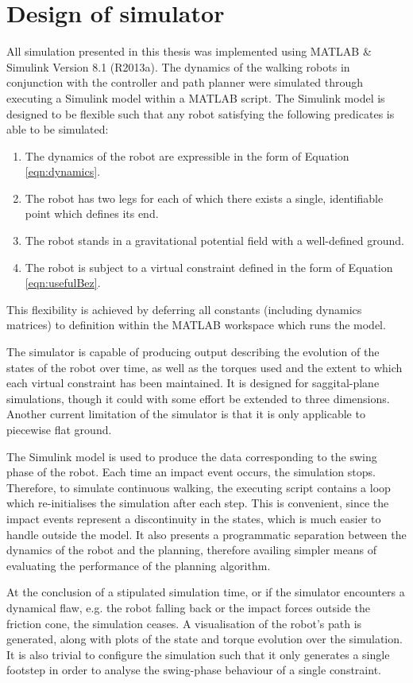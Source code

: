 \section{Design of simulator}
All simulation presented in this thesis was implemented using MATLAB \& Simulink Version 8.1 (R2013a). The dynamics of the walking robots in conjunction with the controller and path planner were simulated through executing a Simulink model within a MATLAB script. The Simulink model is designed to be flexible such that any robot satisfying the following predicates is able to be simulated:
\begin{enumerate}
	\item The dynamics of the robot are expressible in the form of Equation \ref{eqn:dynamics}.
	\item The robot has two legs for each of which there exists a single, identifiable point which defines its end.
	\item The robot stands in a gravitational potential field with a well-defined ground.
	\item The robot is subject to a virtual constraint defined in the form of Equation \ref{eqn:usefulBez}.
\end{enumerate}

This flexibility is achieved by deferring all constants (including dynamics matrices) to definition within the MATLAB workspace which runs the model.

The simulator is capable of producing output describing the evolution of the states of the robot over time, as well as the torques used and the extent to which each virtual constraint has been maintained. It is designed for saggital-plane simulations, though it could with some effort be extended to three dimensions. Another current limitation of the simulator is that it is only applicable to piecewise flat ground.

The Simulink model is used to produce the data corresponding to the swing phase of the robot. Each time an impact event occurs, the simulation stops. Therefore, to simulate continuous walking, the executing script contains a loop which re-initialises the simulation after each step. This is convenient, since the impact events represent a discontinuity in the states, which is much easier to handle outside the model. It also presents a programmatic separation between the dynamics of the robot and the planning, therefore availing simpler means of evaluating the performance of the planning algorithm.

At the conclusion of a stipulated simulation time, or if the simulator encounters a dynamical flaw, e.g. the robot falling back or the impact forces outside the friction cone, the simulation ceases. A visualisation of the robot's path is generated, along with plots of the state and torque evolution over the simulation. It is also trivial to configure the simulation such that it only generates a single footstep in order to analyse the swing-phase behaviour of a single constraint.

